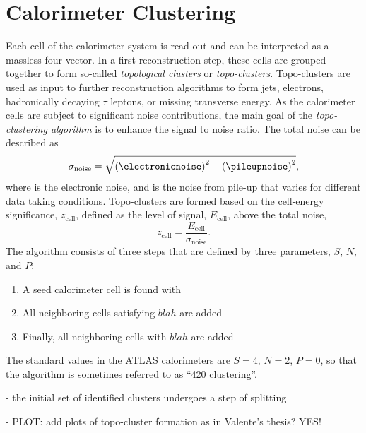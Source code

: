 \section{Calorimeter Clustering}
Each cell of the calorimeter system is read out and can be interpreted as a massless four-vector. In a first reconstruction step, these cells are grouped together to form so-called \emph{topological clusters} or \emph{topo-clusters}. Topo-clusters are used as input to further reconstruction algorithms to form jets, electrons, hadronically decaying $\tau$ leptons, or missing transverse energy.
As the calorimeter cells are subject to significant noise contributions, the main goal of the \emph{topo-clustering algorithm} is to enhance the signal to noise ratio. The total noise can be described as
\begin{equation}
    \sigma_{\text{noise}} = \sqrt{ \left( \electronicnoise  \right)^2  + \left( \pileupnoise  \right)^2 },
\end{equation}
where \electronicnoise is the electronic noise, and \pileupnoise is the noise from pile-up that varies for different data taking conditions.
Topo-clusters are formed based on the cell-energy significance, $z_{\text{cell}}$, defined as the level of signal, $E_{\text{cell}}$, above the total noise,
\begin{equation}
    z_{\text{cell}} = \frac{E_{\text{cell}}}{\sigma_{\text{noise}}}.
\end{equation}
The algorithm consists of three steps that are defined by three parameters, $S$, $N$, and $P$:
\begin{enumerate}
    \item A seed calorimeter cell is found with
    \item All neighboring cells satisfying $blah$ are added
    \item Finally, all neighboring cells with $blah$ are added
\end{enumerate}
The standard values in the ATLAS calorimeters are $S = 4$, $N = 2$, $P = 0$, so that the algorithm is sometimes referred to as ``420 clustering''.

- the initial set of identified clusters undergoes a step of splitting

- PLOT: add plots of topo-cluster formation as in Valente's thesis? YES!

